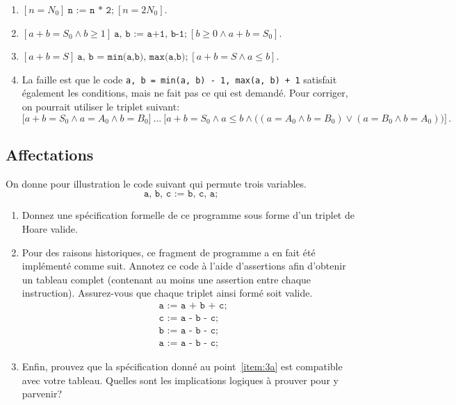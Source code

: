 \begin{solution}
\begin{enumerate}[label={\textbf{\alph*.}}]
	\item $[n = N_0]\ \texttt{n := n * 2;}\ [n = 2N_0]$.
	\item $[a + b = S_0 \land b \ge 1]\ \texttt{a, b := a+1, b-1;}\ [b \ge 0 \land a + b = S_0]$.
	\item $[a + b = S]\ \texttt{a, b = min(a,b), max(a,b);}\ [a + b = S \land a \le b]$.
	\item La faille est que
	le code \texttt{a, b = min(a, b) - 1, max(a, b) + 1}
	satisfait également les conditions, mais ne fait pas ce qui est demandé.
	Pour corriger, on pourrait utiliser le triplet suivant:
	\[
	\Big[a + b = S_0 \land a = A_0 \land b = B_0\Big]\ \texttt{...}\ \Big[a+b = S_0 \land a \le b \land \big((a = A_0 \land b = B_0) \lor (a = B_0 \land b = A_0)\big)\Big]\,.
	\]
\end{enumerate}
\end{solution}

\subsection{Affectations}
On donne pour illustration le code suivant qui permute trois variables.
\[
\texttt{a, b, c := b, c, a;}
\]
\begin{enumerate}[label={\textbf{\alph*.}}]
	\item \label{item:3a} Donnez une spécification formelle de ce programme
	sous forme d'un triplet de Hoare valide.
	\item Pour des raisons historiques,
	ce fragment de programme a en fait été implémenté comme suit.
	Annotez ce code à l'aide d'assertions afin d'obtenir un tableau complet
	(contenant au moins une assertion entre chaque instruction).
	Assurez-vous que chaque triplet ainsi formé soit valide.
	\begin{align*}
		&\texttt{a := a + b + c;}\\
		&\texttt{c := a - b - c;}\\
		&\texttt{b := a - b - c;}\\
		&\texttt{a := a - b - c;}
	\end{align*}
	\item Enfin, prouvez que la spécification donné au point~\ref{item:3a}
	est compatible avec votre tableau.
	Quelles sont les implications logiques à prouver pour y parvenir?
\end{enumerate}

